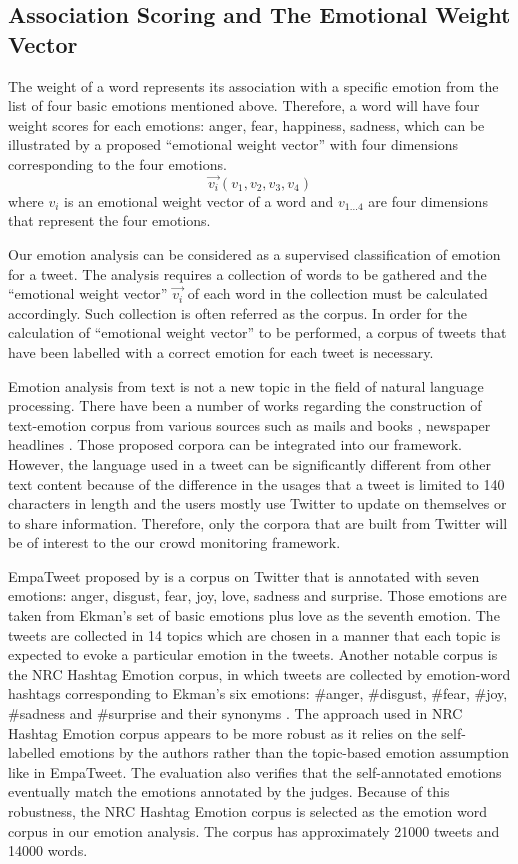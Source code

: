 \subsection{Association Scoring and The Emotional Weight Vector}

The weight of a word represents its association with a specific emotion from the list of four basic emotions mentioned above. Therefore, a word will have four weight scores for each emotions: anger, fear, happiness, sadness, which can be illustrated by a proposed ``emotional weight vector'' with four dimensions corresponding to the four emotions. 
\[
	\vec{v_i}(v_1, v_2, v_3, v_4)
\] where \(v_i\) is an emotional weight vector of a word and \(v_{1...4}\) are four dimensions that represent the four emotions.

Our emotion analysis can be considered as a supervised classification of emotion for a tweet. The analysis requires a collection of words to be gathered and the ``emotional weight vector'' \(\vec{v_i}\) of each word in the collection must be calculated accordingly. Such collection is often referred as the corpus. In order for the calculation of ``emotional weight vector'' to be performed, a corpus of tweets that have been labelled with a correct emotion for each tweet is necessary.

Emotion analysis from text is not a new topic in the field of natural language processing. There have been a number of works regarding the construction of text-emotion corpus from various sources such as mails \citep{mohammad2011tracking} and books \citep{mohammad2011once}, newspaper headlines \citep{strapparava2008learning}. Those proposed corpora can be integrated into our framework. However, the language used in a tweet can be significantly different from other text content because of the difference in the usages that a tweet is limited to 140 characters in length and the users mostly use Twitter to update on themselves or to share information. Therefore, only the corpora that are built from Twitter will be of interest to the our crowd monitoring framework.

EmpaTweet proposed by \citet{roberts2012empatweet} is a corpus on Twitter that is annotated with seven emotions: anger, disgust, fear, joy, love, sadness and surprise. Those emotions are taken from Ekman's set of basic emotions plus love as the seventh emotion. The tweets are collected in 14 topics which are chosen in a manner that each topic is expected to evoke a particular emotion in the tweets. Another notable corpus is the NRC Hashtag Emotion corpus, in which tweets are collected by emotion-word hashtags corresponding to Ekman's six emotions: \#anger, \#disgust, \#fear, \#joy, \#sadness and \#surprise and their synonyms \citep{mohammad2012emotional}. The approach used in NRC Hashtag Emotion corpus appears to be more robust as it relies on the self-labelled emotions by the authors rather than the topic-based emotion assumption like in EmpaTweet. The evaluation also verifies that the self-annotated emotions eventually match the emotions annotated by the judges. Because of this robustness, the NRC Hashtag Emotion corpus is selected as the emotion word corpus in our emotion analysis. The corpus has approximately 21000 tweets and 14000 words.


